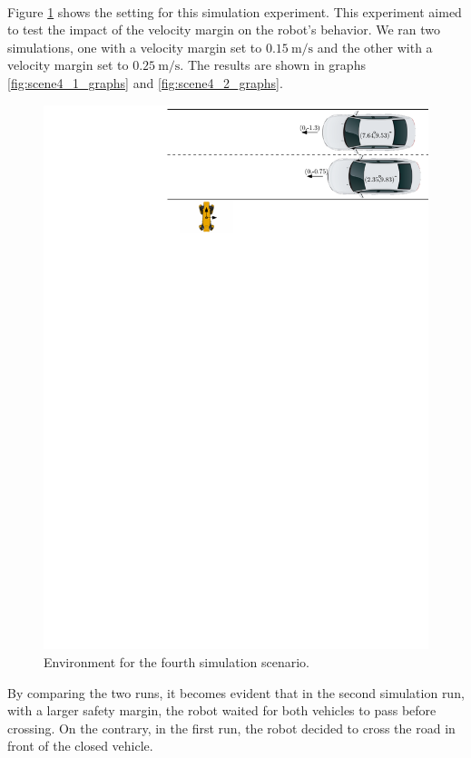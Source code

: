         \\
            Figure \ref{fig:scene4} shows the setting for this simulation experiment. This experiment aimed to test the impact of the velocity margin on the robot's behavior. We ran two simulations, one with a velocity margin set to $0.15\:\si{\m\per\s}$ and the other with a velocity margin set to $0.25\:\si{\m\per\s}$. The results are shown in graphs \ref{fig:scene4_1_graphs} and \ref{fig:scene4_2_graphs}.\\
            \begin{figure}[H]
                \centering
                \includegraphics[width=\linewidth]{images/simulations/scene4.pdf}
                \caption{Environment for the fourth simulation scenario.}
                \label{fig:scene4}
            \end{figure}
            By comparing the two runs, it becomes evident that in the second simulation run, with a larger safety margin, the robot waited for both vehicles to pass before crossing. On the contrary, in the first run, the robot decided to cross the road in front of the closed vehicle.\\
